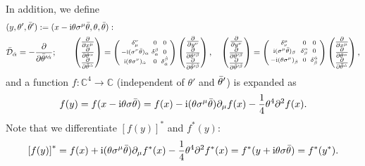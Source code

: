 \documentclass[CheatSheet]{subfiles}
\newcommand{\OD}{{\mathcal D}}
\begin{document}
In addition, we define
\begin{align}
 & (y,\theta',\btheta'):=(x-\ii\theta\sigma^\mu\btheta,\theta,\btheta):
 \\&
\bar\OD_\dalpha = -\pd{}{\btheta^{\prime\dalpha}};\qquad
 \left(\begin{matrix}\pd{}{x^\mu}\\\pd{}{\theta^\alpha}\\\pd{}{\btheta^\dalpha}\end{matrix}\right)
=\left(\begin{smallmatrix}\delta^\nu_\mu&0&0\\-\ii(\sigma^\nu\btheta)_\alpha&\delta^\beta_\alpha&0\\\ii(\theta\sigma^\nu)_\dalpha&0&\delta^\dbeta_\dalpha
       \end{smallmatrix}\right)
 \left(\begin{matrix}\pd{}{y^\nu}\\\pd{}{\theta^{\prime\beta}}\\\pd{}{\btheta^{\prime\dbeta}}\end{matrix}\right),\quad
 \left(\begin{matrix}\pd{}{y^\nu}\\\pd{}{\theta^{\prime\beta}}\\\pd{}{\btheta^{\prime\dbeta}}\end{matrix}\right)
=\left(\begin{smallmatrix}\delta^\mu_\nu&0&0\\\ii(\sigma^\mu\btheta)_\beta&\delta_\beta^\alpha&0\\-\ii(\theta\sigma^\mu)_\dbeta&0&\delta_\dbeta^\dalpha
       \end{smallmatrix}\right)
 \left(\begin{matrix}\pd{}{x^\mu}\\\pd{}{\theta^\alpha}\\\pd{}{\btheta^\dalpha}\end{matrix}\right),
\end{align}
and a function $f:\mathbb C^4\to \mathbb C$ (independent of $\theta'$ and $\bar\theta'$) is expanded as
\begin{equation}
  f(y)
= f(x-\mathrm{i}\theta\sigma\bar\theta)
=f(x)-\mathrm{i} (\theta \sigma^{\mu}\bar\theta) \partial_{\mu}f(x)-\frac{1}{4} \theta^4 \partial^2f(x).
\end{equation}
Note that we differentiate $[f(y)]^*$ and $f^*(y)$:
\begin{equation}
 \left[f(y)\right]^* =
f(x)+\mathrm{i} (\theta \sigma^{\mu}\bar\theta) \partial_{\mu}f^*(x)-\frac{1}{4} \theta^4 \partial^2f^*(x)
=f^*(y+\mathrm{i}\theta\sigma\bar\theta)=f^*(y^*).
\end{equation}
\end{document}
